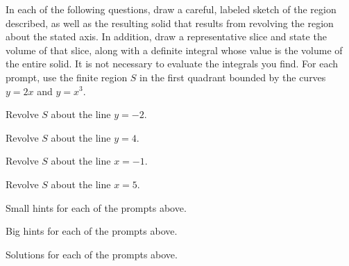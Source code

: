 \begin{activity} \label{A:6.2.3}  In each of the following questions, draw a careful, labeled sketch of the region described, as well as the resulting solid that results from revolving the region about the stated axis.  In addition, draw a representative slice and state the volume of that slice, along with a definite integral whose value is the volume of the entire solid.  It is not necessary to evaluate the integrals you find.  For each prompt, use the finite region $S$ in the first quadrant bounded by the curves $y = 2x$ and $y = x^3$.
\ba
	\item Revolve $S$ about the line $y = -2$.	
	\item Revolve $S$ about the line $y = 4$.
	\item Revolve $S$ about the line $x=-1$.	
	\item Revolve $S$ about the line $x = 5$.
\ea

\end{activity}
\begin{smallhint}
\ba
	\item Small hints for each of the prompts above.
\ea
\end{smallhint}
\begin{bighint}
\ba
	\item Big hints for each of the prompts above.
\ea
\end{bighint}
\begin{activitySolution}
\ba
	\item Solutions for each of the prompts above.
\ea
\end{activitySolution}
\aftera

